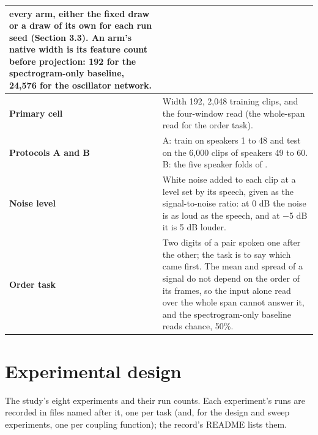 \documentclass[10pt]{article}
\makeatletter
\newcommand{\tmlr@floatbarrier}{\par\vspace{\z@}%
  \ifx\@deferlist\@empty\else\clearpage\fi}
\let\tmlr@section\section
\renewcommand{\section}{\tmlr@floatbarrier\tmlr@section}
\makeatother
\begin{document}
{\begin{longtable}[]{@{}
  >{\raggedright\arraybackslash}p{}
  >{\raggedright\arraybackslash}p{}@{}}
every arm, either the fixed draw or a draw of its own for each run seed
(Section 3.3). An arm's native width is its feature count before
projection: 192 for the spectrogram-only baseline, 24,576 for the
oscillator network. \\
\cmidrule{1-2}\textbf{Primary cell} & Width 192, 2,048 training clips,
and the four-window read (the whole-span read for the order task). \\
\cmidrule{1-2}\textbf{Protocols A and B} & A: train on speakers 1 to 48
and test on the 6,000 clips of speakers 49 to 60. B: the five speaker
folds of \citet{becker2024}. \\
\cmidrule{1-2}\textbf{Noise level} & White noise added to each clip at a
level set by its speech, given as the signal-to-noise ratio: at 0 dB the
noise is as loud as the speech, and at \ensuremath{-}5 dB it is 5 dB
louder. \\
\cmidrule{1-2}\textbf{Order task} & Two digits of a pair spoken one
after the other; the task is to say which came first. The mean and
spread of a signal do not depend on the order of its frames, so the
input alone read over the whole span cannot answer it, and the
spectrogram-only baseline reads chance, 50\%. \\
\end{longtable}
}

\section{Experimental design}\label{experimental-design}

The study's eight experiments and their run counts. Each experiment's
runs are recorded in files named after it, one per task (and, for the
design and sweep experiments, one per coupling function); the record's
README lists them.
\end{document}
